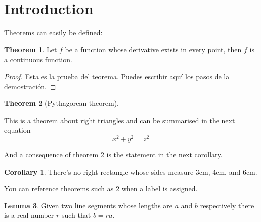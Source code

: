 \documentclass{article}
\theoremstyle{definition}
\newtheorem{theorem}{Theorem}[section]
\newtheorem{corollary}{Corollary}[theorem]
\newtheorem{lemma}[theorem]{Lemma}
\begin{document}
\section{Introduction}
Theorems can easily be defined:

\begin{theorem}
Let $f$ be a function whose derivative exists in every point, then \(f\) is 
a continuous function.
\end{theorem}
\begin{proof}
  Esta es la prueba del teorema. Puedes escribir aquí los pasos de la demostración.
\end{proof}

\begin{theorem}[Pythagorean theorem]
\label{pythagorean}

This is a theorem about right triangles and can be summarised in the next 
equation 
\[ x^2 + y^2 = z^2 \]
\end{theorem}

And a consequence of theorem \ref{pythagorean} is the statement in the next 
corollary.

\begin{corollary}
There's no right rectangle whose sides measure 3cm, 4cm, and 6cm.
\end{corollary}

You can reference theorems such as \ref{pythagorean} when a label is assigned.

\begin{lemma}
Given two line segments whose lengths are \(a\) and \(b\) respectively there is a 
real number \(r\) such that \(b=ra\).
\end{lemma}
\end{document}
